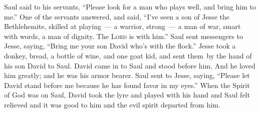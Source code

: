 \begin{inparaenum}
   Saul said to his servants, ``Please look for a man who plays well, and bring him to me.''%
   One of the servants answered, and said, ``I've seen a son of Jesse the Bethlehemite, skilled at playing~--- a warrior, strong~--- a man of war, smart with words, a man of dignity. The \textsc{Lord} is with him.''%
   Saul sent messengers to Jesse, saying, ``Bring me your son David who's with the flock.''%
   Jesse took a donkey, bread, a bottle of wine, and one goat kid, and sent them\understood\ by the hand of his son David to Saul.%
   David came in to Saul and stood before him. And he loved him greatly; and he was his armor bearer.%
   Saul sent to Jesse, saying, ``Please let David stand before me because he has found favor in my eyes.''%
   When the Spirit of God was on Saul, David took the lyre and played with his hand and Saul felt relieved and it was good to him and the evil spirit departed from him.%
\end{inparaenum}
